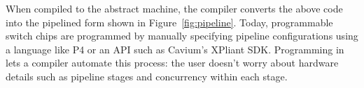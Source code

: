 


When compiled to the \absmachine abstract machine, the \pktlanguage compiler
converts the above code into the pipelined form shown in
Figure~\ref{fig:pipeline}. Today, programmable switch chips are programmed by
manually specifying pipeline configurations using a language like P4 or an API
such as Cavium's XPliant SDK. Programming in \pktlanguage lets a compiler
automate this process: the user doesn't worry about hardware details such as
pipeline stages and concurrency within each stage.

